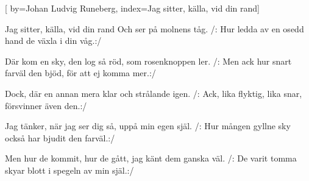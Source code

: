 
[
by={Johan Ludvig Runeberg},
index={Jag sitter, källa, vid din rand}]

\beginverse*
Jag sitter, källa, vid din rand 
Och ser på molnens tåg.
/: Hur ledda av en osedd hand 
de växla i din våg.:/
\endverse

\beginverse* 
Där kom en sky, den log så röd, 
som rosenknoppen ler.
/: Men ack hur snart farväl den bjöd, 
för att ej komma mer.:/
\endverse

\beginverse* 
Dock, där en annan mera klar 
och strålande igen. 
/: Ack, lika flyktig, lika snar, 
försvinner även den.:/
\endverse

\beginverse
Jag tänker, när jag ser dig så, 
uppå min egen själ.
/: Hur mången gyllne sky också 
har bjudit den farväl.:/
\endverse

\beginverse* Men hur de kommit, hur de gått,
jag känt dem ganska väl. 
/: De varit tomma skyar blott
i spegeln av min själ.:/
\endverse
\endsong


